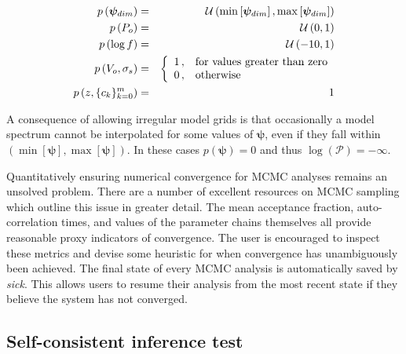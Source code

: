 \documentclass{aastex}
\newcommand{\sick}{\textit{sick}}
\begin{document}
\begin{eqnarray}
p\left(\bm{\psi}_{dim}\right) &=& \mathcal{U}\left(\min\left[\bm{\psi}_{dim}\right], \max\left[\bm{\psi}_{dim}\right]\right) \\
p\left(P_o\right) &=& \mathcal{U}\left(0, 1\right) \\
p\left(\log{f}\right) &=& \mathcal{U}\left(-10, 1\right) \\
p\left(V_o,\sigma_s\right) &=& \left\{
\begin{array}{c l}      
    1\,, &\mbox{for values greater than zero}\\
    0\,, &\mbox{otherwise}
\end{array}\right. \\
p\left(z,\{c_k\}_{k=0}^{m}\right) &=& 1 \\
\label{eq:default_priors}
\end{eqnarray} 

A consequence of allowing irregular model grids is that occasionally a model 
spectrum cannot be interpolated for some values of $\bm{\psi}$, even if they 
fall within $\left(\min\left[\bm{\psi}\right], \max\left[\bm{\psi}\right]\right)$. 
In these cases $p\left(\bm{\psi}\right) = 0$ and thus $\log\left(\mathcal{P}\right) = -\infty$.

Quantitatively ensuring numerical convergence for MCMC analyses remains an 
unsolved problem. There are a number of excellent resources on MCMC sampling 
which outline this issue in greater detail. The mean acceptance fraction, 
auto-correlation times, and values of the parameter chains themselves all 
provide reasonable proxy indicators of convergence. The user is encouraged to 
inspect these metrics and devise some heuristic for when convergence has 
unambiguously been achieved. The final state of every MCMC analysis is 
automatically saved by \sick{}. This allows users to resume their analysis from 
the most recent state if they believe the system has not converged.


\subsection{Self-consistent inference test}
\label{sec:inference-test}
\end{document}
